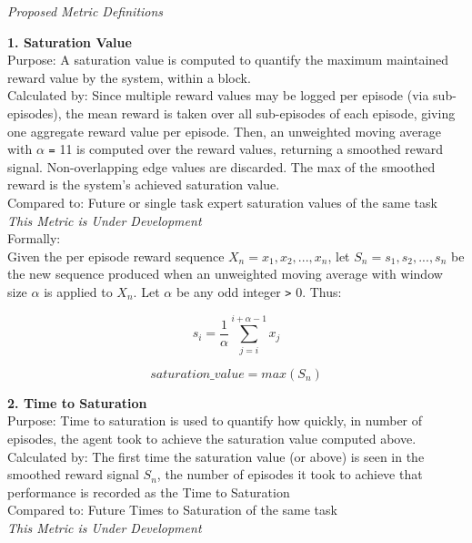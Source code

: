 \begin{large}
\textit{Proposed Metric Definitions}\\[0.1in]
\end{large}

\textbf{1. Saturation Value}\\
Purpose: A saturation value is computed to quantify the maximum maintained reward value by the system, within a block.\\
Calculated by: Since multiple reward values may be logged per episode (via sub-episodes), the mean reward is taken over all sub-episodes of each episode, giving one aggregate reward value per episode. Then, an unweighted moving average with \begin{math}\alpha\end{math} \verb|=| 11 is computed over the reward values, returning a smoothed reward signal. Non-overlapping edge values are discarded. The max of the smoothed reward is the system's achieved saturation value.\\
Compared to: Future or single task expert saturation values of the same task\\        
\textit{This Metric is Under Development}\\[0.1in]

Formally:\\[0.1in]

Given the per episode reward sequence \begin{math}X_n = x_1, x_2, ... , x_n\end{math}, let \begin{math}S_n = s_1, s_2, ... , s_n\end{math} be the new sequence produced when an unweighted moving average with window size \begin{math}\alpha\end{math} is applied to \begin{math}X_n\end{math}. Let \begin{math}\alpha\end{math} be any odd integer \verb|>| 0. Thus:


\[ s_i = \frac{1}{\alpha}\sum_{j=i}^{i+\alpha-1} {x_j} \]


\[saturation\_value = max(S_n)\]

\textbf{2. Time to Saturation}\\
Purpose: Time to saturation is used to quantify how quickly, in number of episodes, the agent took to achieve the saturation value computed above.\\
Calculated by: The first time the saturation value (or above) is seen in the smoothed reward signal \begin{math}S_n\end{math}, the number of episodes it took to achieve that performance is recorded as the Time to Saturation\\
Compared to: Future Times to Saturation of the same task\\
\textit{This Metric is Under Development}\\[0.1in]

